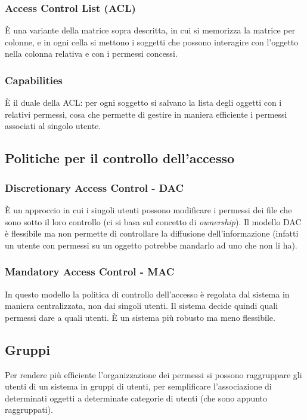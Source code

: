 \documentclass[a4paper, 11pt]{article}
\begin{document}
\begin{multicols}{2}
	\subsubsection{Access Control List (ACL)}
	È una variante della matrice sopra descritta, in cui si memorizza la matrice per colonne, e in ogni cella si mettono i soggetti che possono interagire con l'oggetto nella colonna relativa e con i permessi concessi.
	
	\subsubsection{Capabilities}
	È il duale della ACL: per ogni soggetto si salvano la lista degli oggetti con i relativi permessi, cosa che permette di gestire in maniera efficiente i permessi associati al singolo utente.
	
	\subsection{Politiche per il controllo dell'accesso}
	\subsubsection{Discretionary Access Control - DAC}
		È un approccio in cui i singoli utenti possono modificare i permessi dei file che sono sotto il loro controllo (ci si basa sul concetto di \textit{ownership}). Il modello DAC è flessibile ma non permette di controllare la diffusione dell'informazione (infatti un utente con permessi su un oggetto potrebbe mandarlo ad uno che non li ha).
	
	\subsubsection{Mandatory Access Control - MAC}
	In questo modello la politica di controllo dell'accesso è regolata dal sistema in maniera centralizzata, non dai singoli utenti. Il sistema decide quindi quali permessi dare a quali utenti. È un sistema più robusto ma meno flessibile.
		
		
	\subsection{Gruppi}
	Per rendere più efficiente l'organizzazione dei permessi si possono raggruppare gli utenti di un sistema in gruppi di utenti, per semplificare l'associazione di determinati oggetti a determinate categorie di utenti (che sono appunto raggruppati).
	

\end{multicols}
\end{document}
